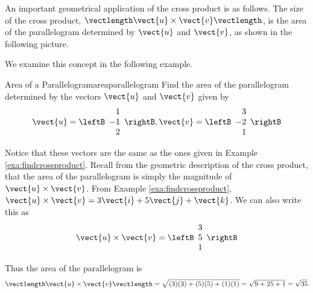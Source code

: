 An important geometrical application of the cross product is as follows. The size of the cross product, $\vectlength \vect{u}\times \vect{v}\vectlength $, is the area of the
parallelogram determined by $\vect{u}$ and $\vect{v}$, as shown in the following picture. 

\begin{center}
\end{center}

We examine this concept in the following example.

\begin{example}{Area of a Parallelogram}{areaparallelogram}
Find the area of the
 parallelogram determined by the vectors $\vect{u}$
and $\vect{v}$ given by 
\begin{equation*}
\vect{u}
=
\leftB
\begin{array}{r}
1 \\
-1 \\
2
\end{array}
\rightB, 
\vect{v}
=
\leftB
\begin{array}{r}
3 \\
-2 \\
1
\end{array}
\rightB
\end{equation*}
\end{example}

\begin{solution}
Notice that these vectors are the same as the ones given in Example \ref{exa:findcrossproduct}.
Recall from the geometric description of the cross
product, that the area of the parallelogram is simply the magnitude of $\vect{u} \times \vect{v}$. 
From Example \ref{exa:findcrossproduct}, $\vect{u} \times \vect{v} = 3\vect{i}+5\vect{j}+\vect{k}$.
We can also write this as
\begin{equation*}
\vect{u} \times \vect{v}
=
\leftB
\begin{array}{r}
3 \\
5 \\
1
\end{array}
\rightB
\end{equation*}

Thus the area of the parallelogram is 
\begin{equation*}
\vectlength \vect{u} \times \vect{v} \vectlength = 
\sqrt{(3)(3) + (5)(5) + (1)(1)} = 
\sqrt{9+25+1}=\sqrt{35}
\end{equation*}
\end{solution}

